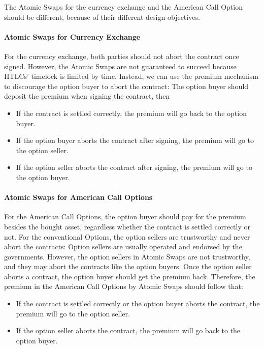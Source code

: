 The Atomic Swaps for the currency exchange and the American Call Option should be different, because of their different design objectives.

\paragraph{Atomic Swaps for Currency Exchange}
For the currency exchange, both parties should not abort the contract once signed.
However, the Atomic Swaps are not guaranteed to succeed because HTLCs' timelock is limited by time.
Instead, we can use the premium mechanism to discourage the option buyer to abort the contract: The option buyer should deposit the premium when signing the contract, then

\begin{itemize}
    \item If the contract is settled correctly, the premium will go back to the option buyer.
    \item If the option buyer aborts the contract after signing, the premium will go to the option seller.
    \item If the option seller aborts the contract after signing, the premium will go to the option buyer.
\end{itemize}

\paragraph{Atomic Swaps for American Call Options}
For the American Call Options, the option buyer should pay for the premium besides the bought asset, regardless whether the contract is settled correctly or not.
For the conventional Options, the option sellers are trustworthy and never abort the contracts: Option sellers are usually operated and endorsed by the governments.
However, the option sellers in Atomic Swaps are not trustworthy, and they may abort the contracts like the option buyers.
Once the option seller aborts a contract, the option buyer should get the premium back.
Therefore, the premium in the American Call Options by Atomic Swaps should follow that: 

\begin{itemize}
    \item If the contract is settled correctly or the option buyer aborts the contract, the premium will go to the option seller.
    \item If the option seller aborts the contract, the premium will go back to the option buyer.
\end{itemize}


